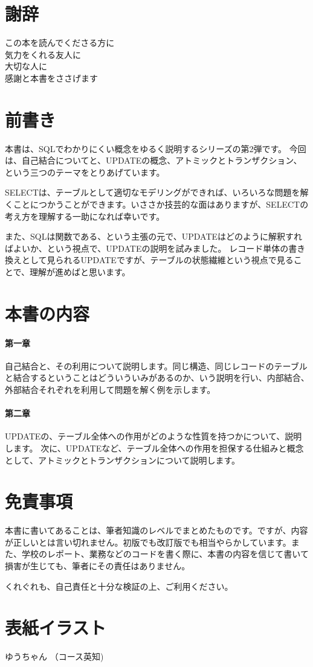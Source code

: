 \section*{謝辞}
\begin{center}
この本を読んでくださる方に \\
気力をくれる友人に \\
大切な人に \\
感謝と本書をささげます
\end{center}

\section*{前書き}

本書は、SQLでわかりにくい概念をゆるく説明するシリーズの第2弾です。
今回は、自己結合についてと、UPDATEの概念、アトミックとトランザクション、という三つのテーマをとりあげています。

SELECTは、テーブルとして適切なモデリングができれば、いろいろな問題を解くことにつかうことができます。いささか技芸的な面はありますが、SELECTの考え方を理解する一助になれば幸いです。

また、SQLは関数である、という主張の元で、UPDATEはどのように解釈すればよいか、という視点で、UPDATEの説明を試みました。
レコード単体の書き換えとして見られるUPDATEですが、テーブルの状態繊維という視点で見ることで、理解が進めばと思います。

\section*{本書の内容}

\paragraph{第一章}

自己結合と、その利用について説明します。同じ構造、同じレコードのテーブルと結合するということはどういういみがあるのか、いう説明を行い、内部結合、外部結合それぞれを利用して問題を解く例を示します。

\paragraph{第二章}

UPDATEの、テーブル全体への作用がどのような性質を持つかについて、説明します。
次に、UPDATEなど、テーブル全体への作用を担保する仕組みと概念として、アトミックとトランザクションについて説明します。

\section*{免責事項}
本書に書いてあることは、筆者知識のレベルでまとめたものです。ですが、内容が正しいとは言い切れません。初版でも改訂版でも相当やらかしています。また、学校のレポート、業務などのコードを書く際に、本書の内容を信じて書いて損害が生じても、筆者にその責任はありません。

くれぐれも、自己責任と十分な検証の上、ご利用ください。

\section*{表紙イラスト}
ゆうちゃん （コース英知)